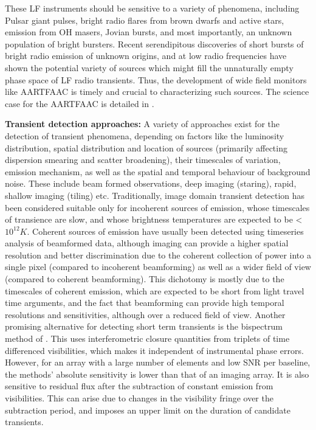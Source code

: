 \documentclass{aa}
\begin{document}
These LF  instruments should be sensitive  to a variety  of phenomena, including
Pulsar giant  pulses, bright  radio flares from  brown dwarfs and  active stars,
emission  from  OH masers,  Jovian  bursts,  and  most importantly,  an  unknown
population of bright bursters.  Recent serendipitous discoveries of short bursts
of  bright radio  emission  of unknown  origins,  and at  low radio  frequencies
\citep{lorimer2007bright,  thornton2013population}   have  shown  the  potential
variety of  sources which  might fill  the unnaturally empty  phase space  of LF
radio transients. Thus, the development  of wide field monitors like AARTFAAC is
timely  and crucial to  characterizing such  sources. The  science case  for the
AARTFAAC is detailed in \citep{wijers2013aartfaac}.

\textbf{Transient detection  approaches:} A variety  of approaches exist  for the
detection  of transient  phenomena,  depending on  factors  like the  luminosity
distribution, spatial distribution and  location of sources (primarily affecting
dispersion  smearing and  scatter  broadening), their  timescales of  variation,
emission mechanism, as well as  the spatial and temporal behaviour of background
noise.  These  include beam formed observations, deep  imaging (staring), rapid,
shallow imaging  (tiling) etc.  Traditionally, image  domain transient detection
has  been considered  suitable only  for incoherent  sources of  emission, whose
timescales  of  transience  are  slow,  and whose  brightness  temperatures  are
expected  to be  <$10^{12}K$.  Coherent  sources of  emission have  usually been
detected  using timeseries  analysis of  beamformed data,  although  imaging can
provide  a  higher spatial  resolution  and  better  discrimination due  to  the
coherent  collection  of power  into  a  single  pixel (compared  to  incoherent
beamforming)  as  well   as  a  wider  field  of   view  (compared  to  coherent
beamforming).   This dichotomy  is  mostly  due to  the  timescales of  coherent
emission, which are  expected to be short from light  travel time arguments, and
the   fact  that  beamforming   can  provide   high  temporal   resolutions  and
sensitivities,  although  over  a  reduced  field of  view.   Another  promising
alternative  for detecting  short term  transients is  the bispectrum  method of
\citet{law2012all}.  This uses  interferometric closure quantities from triplets
of  time differenced visibilities,  which makes  it independent  of instrumental
phase errors.  However, for an array with a large number of elements and low SNR
per baseline, the methods' absolute sensitivity is lower than that of an imaging
array.  It is also sensitive to  residual flux after the subtraction of constant
emission from  visibilities.  This  can arise due  to changes in  the visibility
fringe over the  subtraction period, and imposes an upper  limit on the duration
of candidate transients.
\end{document}
